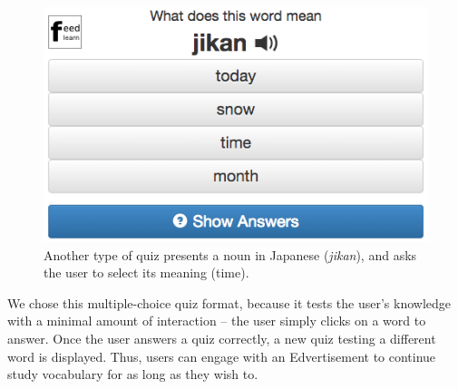 \documentclass{sigchi}
\begin{document}
\begin{figure}
\centering
\includegraphics[width=1.0\columnwidth]{quiz1}
\caption{Another type of quiz presents a noun in Japanese (\textit{jikan}), and asks the user to select its meaning (time).}
\label{fig:quiz1}
\end{figure}

We chose this multiple-choice quiz format, because it tests the user's knowledge with a minimal amount of interaction -- the user simply clicks on a word to answer. Once the user answers a quiz correctly, a new quiz testing a different word is displayed. Thus, users can engage with an Edvertisement to continue study vocabulary for as long as they wish to.


\end{document}
